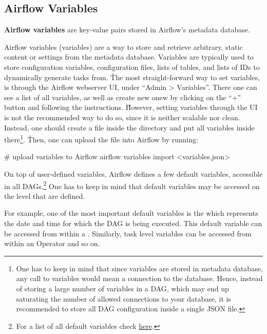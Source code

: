 \subsection{Airflow Variables}

\textbf{Airflow variables} are key-value pairs stored in Airflow's metadata database.
\ed

Airflow variables (variables) are a way to store and retrieve arbitrary, static content or settings from the metadata
database. Variables are typically used to store configuration variables, configuration files, lists of tables, and lists
of IDs to dynamically generate tasks from. \v

The most straight-forward way to set variables, is through the Airflow webserver UI, under ``Admin > Variables''. There
one can see a list of all variables, as well as create new onew by clicking on the ``+'' button and following the
instructions. \v

However, setting variables through the UI is not the recommended way to do so, since it is neither scalable nor clean.
Instead, one should create a  file inside the  directory and put all variables inside
there\footnote{One has to keep in mind that since variables are stored in metadata database, any call to variables would
mean a connection to the database. Hence, instead of storing a large number of variables in a DAG, which may end up
saturating the number of allowed connections to your database, it is recommended to store all DAG configuration inside a
single JSON file.}. \v

Then, one can upload the file into Airflow by running:
\begin{bash}
# upload variables to Airflow
airflow variables import <variables.json>
\end{bash}

On top of user-defined variables, Airflow defines a few default variables, accessible in all DAGs.\footnote{For a list
of all default variables check \href{https://airflow.apache.org/docs/apache-airflow/stable/templates-ref.html}{here}.}
One has to keep in mind that default variables may be accessed on the level that are defined.

\be
For example, one of the most important default variables is the  which represents the date and
time for which the DAG is being executed. This default variable can be accessed from within a . Similarly,
task level variables can be accessed from within an Operator and so on.
\ee

